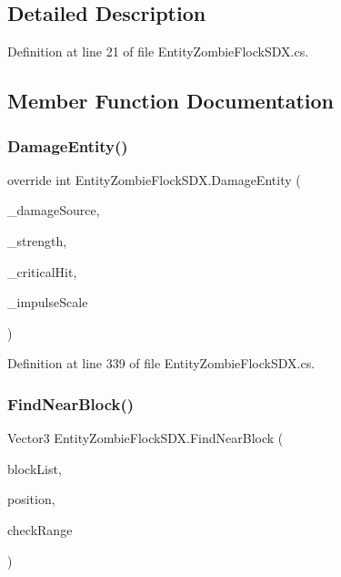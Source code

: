 \subsection{Detailed Description}


Definition at line 21 of file Entity\+Zombie\+Flock\+S\+D\+X.\+cs.



\subsection{Member Function Documentation}
\mbox{\label{class_entity_zombie_flock_s_d_x_ab53b54babb3ad00b48f251ed424ea8e9}} 
\subsubsection{\texorpdfstring{DamageEntity()}{DamageEntity()}}
{\footnotesize\ttfamily override int Entity\+Zombie\+Flock\+S\+D\+X.\+Damage\+Entity (\begin{DoxyParamCaption}\item[{Damage\+Source}]{\+\_\+damage\+Source,  }\item[{int}]{\+\_\+strength,  }\item[{bool}]{\+\_\+critical\+Hit,  }\item[{float}]{\+\_\+impulse\+Scale }\end{DoxyParamCaption})}



Definition at line 339 of file Entity\+Zombie\+Flock\+S\+D\+X.\+cs.

\mbox{\label{class_entity_zombie_flock_s_d_x_a70cabbcd217d21a24716c745866666f4}} 
\subsubsection{\texorpdfstring{FindNearBlock()}{FindNearBlock()}}
{\footnotesize\ttfamily Vector3 Entity\+Zombie\+Flock\+S\+D\+X.\+Find\+Near\+Block (\begin{DoxyParamCaption}\item[{string \mbox{[}$\,$\mbox{]}}]{block\+List,  }\item[{Vector3}]{position,  }\item[{int}]{check\+Range }\end{DoxyParamCaption})}



